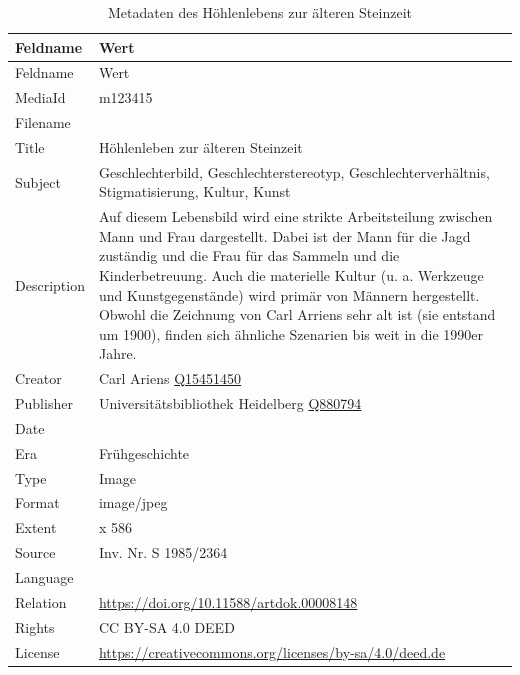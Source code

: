 \documentclass[
  nswissgerman,
  letterpaper,
  DIV=11,
  numbers=noendperiod]{scrartcl}
\begin{document}
\begin{longtable}[]{@{}
  >{\raggedright\arraybackslash}p{}
  >{\raggedright\arraybackslash}p{}@{}}
\caption{Metadaten des Höhlenlebens zur älteren
Steinzeit}\label{tbl-metadaten-hoehlenleben-zur-aelteren-steinzeit}\tabularnewline
\toprule\noalign{}
\begin{minipage}[b]{\linewidth}\raggedright
Feldname
\end{minipage} & \begin{minipage}[b]{\linewidth}\raggedright
Wert
\end{minipage} \\
\midrule\noalign{}
\endfirsthead
\toprule\noalign{}
\begin{minipage}[b]{\linewidth}\raggedright
Feldname
\end{minipage} & \begin{minipage}[b]{\linewidth}\raggedright
Wert
\end{minipage} \\
\midrule\noalign{}
\endhead
\bottomrule\noalign{}
\endlastfoot
MediaId & m123415 \\
Filename & \\
Title & Höhlenleben zur älteren Steinzeit \\
Subject & Geschlechterbild, Geschlechterstereotyp,
Geschlechterverhältnis, Stigmatisierung, Kultur, Kunst \\
Description & Auf diesem Lebensbild wird eine strikte Arbeitsteilung
zwischen Mann und Frau dargestellt. Dabei ist der Mann für die Jagd
zuständig und die Frau für das Sammeln und die Kinderbetreuung. Auch die
materielle Kultur (u. a. Werkzeuge und Kunstgegenstände) wird primär von
Männern hergestellt. Obwohl die Zeichnung von Carl Arriens sehr alt ist
(sie entstand um 1900), finden sich ähnliche Szenarien bis weit in die
1990er Jahre. \\
Creator & Carl Ariens
\href{https://www.wikidata.org/wiki/Q15451450}{Q15451450} \\
Publisher & Universitätsbibliothek Heidelberg
\href{https://www.wikidata.org/wiki/Q880794}{Q880794} \\
Date & 1927 \\
Era & Frühgeschichte \\
Type & Image \\
Format & image/jpeg \\
Extent & 842 x 586 \\
Source & Inv. Nr. S 1985/2364 \\
Language & \\
Relation & \url{https://doi.org/10.11588/artdok.00008148} \\
Rights & CC BY-SA 4.0 DEED \\
License &
\url{https://creativecommons.org/licenses/by-sa/4.0/deed.de} \\
\end{longtable}
\end{document}
